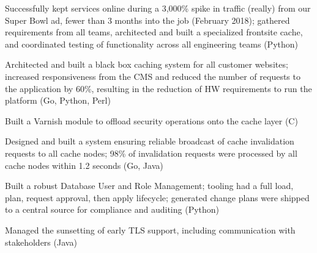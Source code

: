 %
\item Successfully kept services online during a 3,000\% spike in traffic (really) from our Super Bowl ad, fewer than 3
  months into the job (February 2018); gathered requirements from all teams, architected and built a specialized
  frontsite cache, and coordinated testing of functionality across all engineering teams (Python)

\item Architected and built a black box caching system for all customer websites; increased responsiveness from the CMS
  and reduced the number of requests to the application by 60\%, resulting in the reduction of HW requirements to run
  the platform (Go, Python, Perl)

\item Built a Varnish module to offload security operations onto the cache layer (C)

\item Designed and built a system ensuring reliable broadcast of cache invalidation requests to all cache nodes; 98\% of
  invalidation requests were processed by all cache nodes within 1.2 seconds (Go, Java)

\item Built a robust Database User and Role Management; tooling had a full load, plan, request approval, then apply
  lifecycle; generated change plans were shipped to a central source for compliance and auditing (Python)

\item Managed the sunsetting of early TLS support, including communication with stakeholders (Java)
